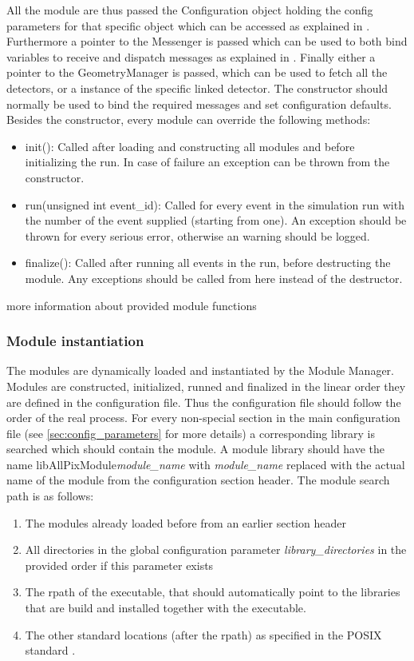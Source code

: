 All the module are thus passed the Configuration object holding the config parameters for that specific object which can be accessed as explained in \needref. Furthermore a pointer to the Messenger is passed which can be used to both bind variables to receive and dispatch messages as explained in \needref. Finally either a pointer to the GeometryManager is passed, which can be used to fetch all the detectors, or a instance of the specific linked detector. The constructor should normally be used to bind the required messages and set configuration defaults. Besides the constructor, every module can override the following methods:
\begin{itemize}
\item init(): Called after loading and constructing all modules and before initializing the run. In case of failure an exception can be thrown from the constructor.
\item run(unsigned int event\_id): Called for every event in the simulation run with the number of the event supplied (starting from one). An exception should be thrown for every serious error, otherwise an warning should be logged.
\item finalize(): Called after running all events in the run, before destructing the module. Any exceptions should be called from here instead of the destructor.
\end{itemize}

\todo more information about provided module functions \todo

\subsubsection{Module instantiation}
\label{sec:module_instantiation}
The modules are dynamically loaded and instantiated by the Module Manager. Modules are constructed, initialized, runned and finalized in the linear order they are defined in the configuration file. Thus the configuration file should follow the order of the real process. For every non-special section in the main configuration file (see \ref{sec:config_parameters} for more details) a corresponding library is searched which should contain the module. A module library should have the name libAllPixModule\textit{module\_name} with \textit{module\_name} replaced with the actual name of the module from the configuration section header. The module search path is as follows:
\begin{enumerate}
\item The modules already loaded before from an earlier section header
\item All directories in the global configuration parameter \textit{library\_directories} in the provided order if this parameter exists
\item The rpath of the executable, that should automatically point to the libraries that are build and installed together with the executable.
\item The other standard locations (after the rpath) as specified in the POSIX standard \needcite.
\end{enumerate}

